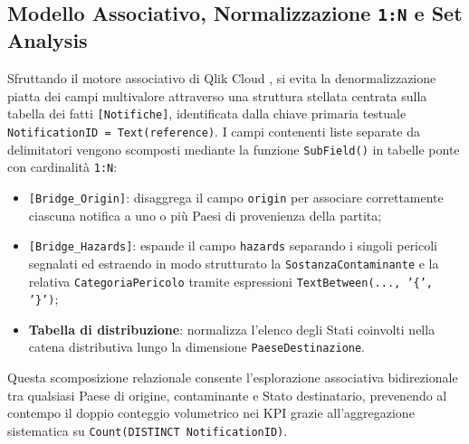 \subsection{Modello Associativo, Normalizzazione \texttt{1:N} e Set Analysis}
Sfruttando il motore associativo di Qlik Cloud \citep{qlik_docs}, si evita la denormalizzazione piatta dei campi multivalore attraverso una struttura stellata centrata sulla tabella dei fatti \texttt{[Notifiche]}, identificata dalla chiave primaria testuale \texttt{NotificationID = Text(reference)}. I campi contenenti liste separate da delimitatori vengono scomposti mediante la funzione \texttt{SubField()} in tabelle ponte con cardinalità \texttt{1:N}:
\begin{itemize}
    \item \texttt{[Bridge\_Origin]}: disaggrega il campo \texttt{origin} per associare correttamente ciascuna notifica a uno o più Paesi di provenienza della partita;
    \item \texttt{[Bridge\_Hazards]}: espande il campo \texttt{hazards} separando i singoli pericoli segnalati ed estraendo in modo strutturato la \texttt{SostanzaContaminante} e la relativa \texttt{CategoriaPericolo} tramite espressioni \texttt{TextBetween(..., '\{', '\}')};
    \item \textbf{Tabella di distribuzione}: normalizza l'elenco degli Stati coinvolti nella catena distributiva lungo la dimensione \texttt{PaeseDestinazione}.
\end{itemize}
Questa scomposizione relazionale consente l'esplorazione associativa bidirezionale tra qualsiasi Paese di origine, contaminante e Stato destinatario, prevenendo al contempo il doppio conteggio volumetrico nei KPI grazie all'aggregazione sistematica su \texttt{Count(DISTINCT NotificationID)}.


